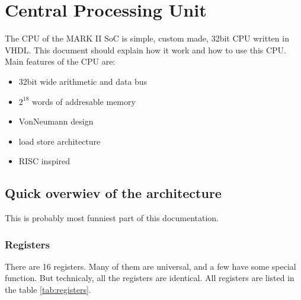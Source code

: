 \section{Central Processing Unit}
The CPU of the MARK II SoC is simple, custom made, 32bit CPU written in 
VHDL. This document should explain how it work and how to use this CPU.
Main features of the CPU are:

\begin{itemize}
    \item 32bit wide arithmetic and data bus
    \item $2^{18}$ words of addresable memory
    \item VonNeumann design
    \item load store architecture
    \item RISC inspired
\end{itemize}

\subsection{Quick overwiev of the architecture}

This is probably most funniest part of this documentation. 

\subsubsection{Registers}
There are 16 registers. Many of them are universal, and a few have some
special function. But technicaly, all the registers are identical. All
registers are listed in the table \ref{tab:registers}.

